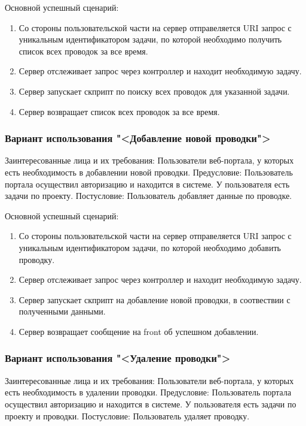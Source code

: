 Основной успешный сценарий:
\begin{enumerate}
	\item Со стороны пользовательской части на сервер отправеляется URI запрос с уникальным идентификатором задачи, по которой необходимо получить список всех проводок за все время.
	\item Сервер отслеживает запрос через контроллер и находит необходимую задачу.
	\item Сервер запускает скприпт по поиску всех проводок для указанной задачи.
	\item Сервер возвращает список всех проводок за все время.
\end{enumerate}

\subsubsection{Вариант использования "<Добавление новой проводки">}

Заинтересованные лица и их требования: Пользователи веб-портала, у которых есть необходимость в добавлении новой проводки.
Предусловие: Пользователь портала осуществил авторизацию и находится в системе. У пользователя есть задачи по проекту. Постусловие: Пользователь добавляет данные по проводке.

Основной успешный сценарий:
\begin{enumerate}
	\item Со стороны пользовательской части на сервер отправеляется URI запрос с уникальным идентификатором задачи, по которой необходимо добавить проводку.
	\item Сервер отслеживает запрос через контроллер и находит необходимую задачу.
	\item Сервер запускает скприпт на добавление новой проводки, в соотвествии с полученными данными.
	\item Сервер возвращает сообщение на front об успешном добавлении.
\end{enumerate}

\subsubsection{Вариант использования "<Удаление проводки">}

Заинтересованные лица и их требования: Пользователи веб-портала, у которых есть необходимость в удалении проводки.
Предусловие: Пользователь портала осуществил авторизацию и находится в системе. У пользователя есть задачи по проекту и проводки. Постусловие: Пользователь удаляет проводку.

